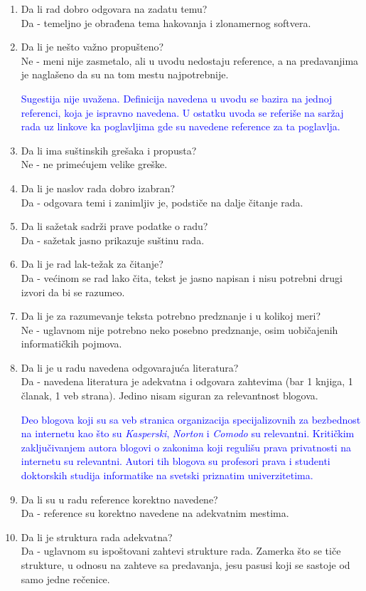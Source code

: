 \documentclass[a4paper]{report}
\newcommand{\odgovor}[1]{\textcolor{blue}{#1}}
\begin{document}
\begin{enumerate}
\item Da li rad dobro odgovara na zadatu temu?\\
Da - temeljno je obrađena tema hakovanja i zlonamernog softvera.
\item Da li je nešto važno propušteno?\\
Ne - meni nije zasmetalo, ali u uvodu nedostaju reference, a na predavanjima je naglašeno da su na tom mestu najpotrebnije.

\odgovor{Sugestija nije uvažena. Definicija navedena u uvodu se bazira na jednoj referenci, koja je ispravno navedena. U ostatku uvoda se referiše na saržaj rada uz linkove ka poglavljima gde su navedene reference za ta poglavlja.}

\item Da li ima suštinskih grešaka i propusta?\\
Ne - ne primećujem velike greške.
\item Da li je naslov rada dobro izabran?\\
Da - odgovara temi i zanimljiv je, podstiče na dalje čitanje rada.
\item Da li sažetak sadrži prave podatke o radu?\\
Da - sažetak jasno prikazuje suštinu rada.
\item Da li je rad lak-težak za čitanje?\\
Da - većinom se rad lako čita, tekst je jasno napisan i nisu potrebni drugi izvori da bi se razumeo.
\item Da li je za razumevanje teksta potrebno predznanje i u kolikoj meri?\\
Ne - uglavnom nije potrebno neko posebno predznanje, osim uobičajenih informatičkih pojmova.
\item Da li je u radu navedena odgovarajuća literatura?\\
Da - navedena literatura je adekvatna i odgovara zahtevima (bar 1 knjiga, 1 članak, 1 veb strana).
Jedino nisam siguran za relevantnost blogova.

\odgovor{Deo blogova koji su sa veb stranica organizacija specijalizovnih za bezbednost na internetu kao što su \textit{Kasperski}, \textit{Norton} i \textit{Comodo} su relevantni. 
Kritičkim zaključivanjem autora blogovi o zakonima koji regulišu prava privatnosti na internetu su relevantni.
Autori tih blogova su profesori prava i studenti doktorskih studija informatike na svetski priznatim univerzitetima.}
\item Da li su u radu reference korektno navedene?\\
Da - reference su korektno navedene na adekvatnim mestima.
\item Da li je struktura rada adekvatna?\\
Da - uglavnom su ispoštovani zahtevi strukture rada.
Zamerka što se tiče strukture, u odnosu na zahteve sa predavanja, jesu pasusi koji se sastoje od samo jedne rečenice.


\end{enumerate}
\end{document}
